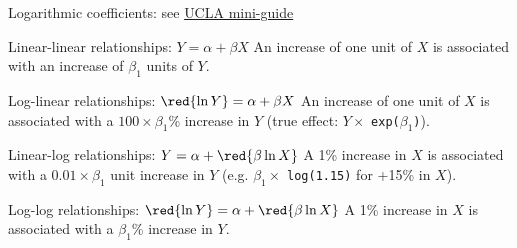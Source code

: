 \documentclass[t]{beamer}
\begin{document}
	\begin{frame}[c]{Logarithmic coefficients: see \href{https://stats.idre.ucla.edu/other/mult-pkg/faq/general/faqhow-do-i-interpret-a-regression-model-when-some-variables-are-log-transformed/}{UCLA mini-guide}}
	
		\begin{block}{Linear-linear relationships: $Y = \alpha + \beta X$}
			An increase of one unit of $X$ is associated with an increase of $\beta_1$ units of $Y$.
		\end{block}
	
		\begin{block}{Log-linear relationships: $\red{\ln Y} = \alpha + \beta X$}
			An increase of one unit of $X$ is associated with a $100 \times \beta_1$\% increase in $Y$ (true effect: $Y \times$ \texttt{exp($\beta_1$)}).
		\end{block}

		\begin{block}{Linear-log relationships: $Y = \alpha + \red{\beta \ln X}$}
			A 1\% increase in $X$ is associated with a $0.01 \times \beta_1$ unit increase in $Y$ (e.g. $\beta_1 \times$ \texttt{log(1.15)} for +15\% in $X$).
		\end{block}
	
		\begin{block}{Log-log relationships: $\red{\ln Y} = \alpha + \red{\beta \ln X}$}
			A 1\% increase in $X$ is associated with a $\beta_1$\% increase in $Y$.
		\end{block}
	
	\end{frame}
	
\end{document}
